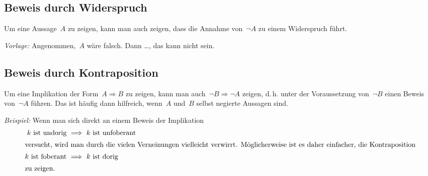 \documentclass[12pt,a4paper,ngerman]{scrartcl}
\theoremstyle{definition}
\theoremstyle{plain}
\theoremstyle{remark}
\begin{document}
\subsection*{Beweis durch Widerspruch}

Um eine Aussage~$A$ zu zeigen, kann man auch zeigen, dass die Annahme von~$\neg
A$ zu einem Widerspruch führt.

\emph{Vorlage:} Angenommen,~$A$ wäre falsch. Dann \ldots, das kann nicht sein.


\subsection*{Beweis durch Kontraposition}

Um eine Implikation der Form~$A \Rightarrow B$ zu zeigen, kann man auch~$\neg B
\Rightarrow \neg A$ zeigen, d.\,h. unter der Voraussetzung von~$\neg B$ einen
Beweis von~$\neg A$ führen.
Das ist häufig dann hilfreich, wenn~$A$ und~$B$ selbst negierte Aussagen sind.

\emph{Beispiel:} Wenn man sich direkt an einem Beweis der Implikation
\begin{align*}\text{$k$ ist undorig} &\ \Longrightarrow\  \text{$k$ ist unfoberant} \\
\intertext{versucht,
wird man durch die vielen Verneinungen vielleicht verwirrt. Möglicherweise ist
es daher einfacher, die Kontraposition}
\text{$k$ ist foberant} &\ \Longrightarrow\  \text{$k$ ist dorig} \\
\intertext{zu zeigen.}\end{align*}
\end{document}
